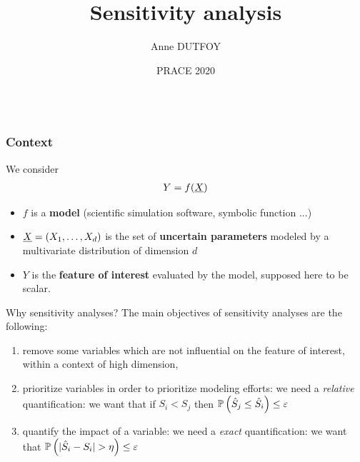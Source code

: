 \documentclass[8pt]{beamer}
\title[Sensitivity analysis]{Sensitivity analysis}
\author[Anne Dutfoy]{
 Anne DUTFOY
}
\institute[]{
 EDF R\&D PERICLES. \\
 anne.dutfoy@edf.Fr
}
\date[PRACE 2020]{PRACE 2020}
\begin{document}

\begin{frame}[plain]
  \begin{columns}
    \titlepage
    \vfill
  \end{columns}
\end{frame}






\begin{frame}
  \frametitle{Context}
\small
We consider
\alert{
\begin{align*}
 Y=f({\underline{X}})
\end{align*}
}
\begin{itemize}
  \item $f$ is a {\bf model} (scientific simulation software, symbolic function ...)
  \item ${\underline{X}}=(X_1, \dots, X_d)$ is the set of  {\bf uncertain parameters } modeled by a multivariate distribution of dimension $d$
  \item $Y$ is the {\bf feature of interest} evaluated by the model, supposed here to be scalar.
\end{itemize}

  \begin{block}{Why sensitivity analyses?}
  The main objectives of sensitivity analyses are the following:
\begin{enumerate}
 \item \alert{remove some variables} which are not influential on the feature of interest, within a context of high dimension,
 \item\alert{ prioritize variables } in order to prioritize modeling efforts: we need a  \emph{relative} quantification: we want that if $S_i < S_j$ then $\mathbb{P}\left( \hat{S}_j \leq \hat{S}_i \right) \leq \varepsilon$
 \item \alert{quantify the impact of a variable}: we need a \emph{exact} quantification: we want that $\mathbb{P}\left( |\hat{S}_i - S_i| > \eta \right) \leq \varepsilon$
\end{enumerate}
\end{block}
\end{frame}
\end{document}
